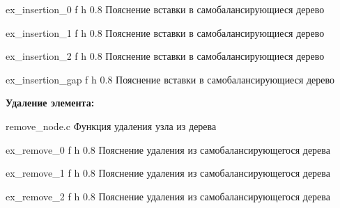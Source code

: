\documentclass{bmstu}
\begin{document}
        {ex_insertion_0} %
        {f} %
        {h} %
        {0.8\textwidth} %
        {Пояснение вставки в самобалансирующиеся дерево} %

        {ex_insertion_1} %
        {f} %
        {h} %
        {0.8\textwidth} %
        {Пояснение вставки в самобалансирующиеся дерево} %

        {ex_insertion_2} %
        {f} %
        {h} %
        {0.8\textwidth} %
        {Пояснение вставки в самобалансирующиеся дерево} %

        {ex_insertion_gap} %
        {f} %
        {h} %
        {0.8\textwidth} %
        {Пояснение вставки в самобалансирующиеся дерево} %

    \clearpage
    \textbf{Удаление элемента:}

        {remove_node.c}
        {Функция удаления узла из дерева}

        {ex_remove_0} %
        {f} %
        {h} %
        {0.8\textwidth} %
        {Пояснение удаления из самобалансирующегося дерева} %

        {ex_remove_1} %
        {f} %
        {h} %
        {0.8\textwidth} %
        {Пояснение удаления из самобалансирующегося дерева} %

        {ex_remove_2} %
        {f} %
        {h} %
        {0.8\textwidth} %
        {Пояснение удаления из самобалансирующегося дерева} %
\end{document}
